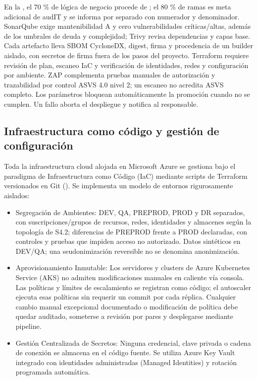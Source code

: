 En la , el 70 \% de lógica de negocio procede de ; el 80 \% de ramas es meta adicional de audIT y se informa por separado con numerador y denominador. SonarQube exige mantenibilidad A y cero vulnerabilidades críticas/altas, además de los umbrales de deuda y complejidad; Trivy revisa dependencias y capas base. Cada artefacto lleva SBOM CycloneDX, digest, firma y procedencia de un builder aislado, con secretos de firma fuera de los pasos del proyecto. Terraform requiere revisión de plan, escaneo IaC y verificación de identidades, redes y configuración por ambiente. ZAP complementa pruebas manuales de autorización y trazabilidad por control ASVS 4.0 nivel 2; un escaneo no acredita ASVS completo. Los parámetros bloquean automáticamente la promoción cuando no se cumplen. Un fallo aborta el despliegue y notifica al responsable.

\FloatBarrier
\subsection{Infraestructura como código y gestión de configuración}\label{sec:6-desarrollo-iac}\label{sec:06-infraestructura-como-codigo-y-gestion-de-configuracion}

Toda la infraestructura cloud alojada en Microsoft Azure se gestiona bajo el paradigma de Infraestructura como Código (IaC) mediante scripts de Terraform versionados en Git (). Se implementa un modelo de entornos rigurosamente aislados:

\begin{itemize}
\item Segregación de Ambientes: DEV, QA, PREPROD, PROD y DR separados, con suscripciones/grupos de recursos, redes, identidades y almacenes según la topología de S4.2; diferencias de PREPROD frente a PROD declaradas, con controles y pruebas que impiden acceso no autorizado. Datos sintéticos en DEV/QA; una seudonimización reversible no se denomina anonimización.
\item Aprovisionamiento Inmutable: Los servidores y clusters de Azure Kubernetes Service (AKS) no admiten modificaciones manuales en caliente vía consola. Las políticas y límites de escalamiento se registran como código; el autoscaler ejecuta esas políticas sin requerir un commit por cada réplica. Cualquier cambio manual excepcional documentado o modificación de política debe quedar auditado, someterse a revisión por pares y desplegarse mediante pipeline.
\item Gestión Centralizada de Secretos: Ninguna credencial, clave privada o cadena de conexión se almacena en el código fuente. Se utiliza Azure Key Vault integrado con identidades administradas (Managed Identities) y rotación programada automática.
\end{itemize}


